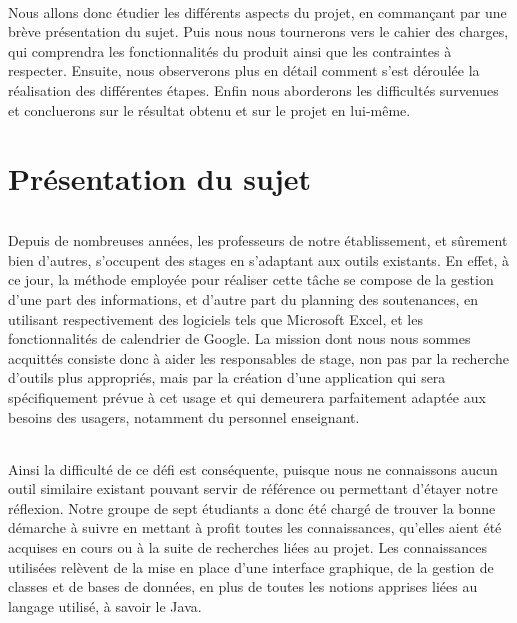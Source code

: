 \documentclass[a4paper,10pt]{report}
\begin{document}
  \paragraph{}
    Nous allons donc étudier les différents aspects du projet, en commançant par une brève présentation du sujet. 
    Puis nous nous tournerons vers le cahier des charges, qui comprendra les fonctionnalités du produit ainsi que les contraintes à respecter.
    Ensuite, nous observerons plus en détail comment s'est déroulée la réalisation des différentes étapes.
    Enfin nous aborderons les difficultés survenues et concluerons sur le résultat obtenu et sur le projet en lui-même.



\part{Présentation du sujet}
  \paragraph{}
    Depuis de nombreuses années, les professeurs de notre établissement, et sûrement bien d'autres, s'occupent des stages en s'adaptant aux outils existants.
    En effet, à ce jour, la méthode employée pour réaliser cette tâche se compose de la gestion d'une part des informations, et d'autre part du planning des soutenances, en utilisant respectivement des logiciels tels que Microsoft Excel, et les fonctionnalités de calendrier de Google.
    La mission dont nous nous sommes acquittés consiste donc à aider les responsables de stage, non pas par la recherche d'outils plus appropriés, mais par la création d'une application qui sera spécifiquement prévue à cet usage et qui demeurera parfaitement adaptée aux besoins des usagers, notamment du personnel enseignant.

  \paragraph{}
    Ainsi la difficulté de ce défi est conséquente, puisque nous ne connaissons aucun outil similaire existant pouvant servir de référence ou permettant d'étayer notre réflexion.
    Notre groupe de sept étudiants a donc été chargé de trouver la bonne démarche à suivre en mettant à profit toutes les connaissances, qu'elles aient été acquises en cours ou à la suite de recherches liées au projet.
    Les connaissances utilisées relèvent de la mise en place d'une interface graphique, de la gestion de classes et de bases de données, en plus de toutes les notions apprises liées au langage utilisé, à savoir le Java.
  
\end{document}
